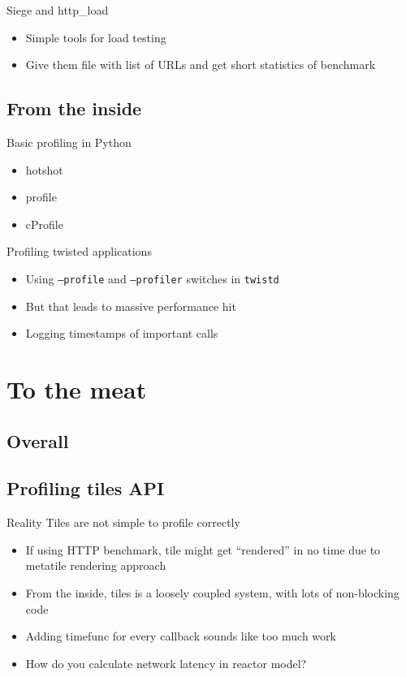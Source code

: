 \documentclass[16pt]{beamer}
\begin{document}
\begin{frame}{Siege and http\_load}
  \begin{itemize}
  \item Simple tools for load testing
  \item Give them file with list of URLs and get short statistics of benchmark
  \end{itemize}
\end{frame}

\subsection{From the inside}

\begin{frame}{Basic profiling in Python}
  \begin{itemize}
  \item hotshot
  \item profile
  \item cProfile
  \end{itemize}
\end{frame}

\begin{frame}{Profiling twisted applications}
  \begin{itemize}
  \item Using \texttt{--profile} and \texttt{--profiler}
    switches in \texttt{twistd}
  \item But that leads to massive performance hit
  \item Logging timestamps of important calls
  \end{itemize}
\end{frame}

\section{To the meat}

\subsection{Overall}

\subsection{Profiling tiles API}

\begin{frame}{Reality}
  Tiles are not simple to profile correctly
  \begin{itemize}
  \item If using HTTP benchmark, tile might get ``rendered'' in no time due to metatile rendering approach
  \item From the inside, tiles is a loosely coupled system, with lots of non-blocking code
  \item Adding timefunc for every callback sounds like too much work
  \item How do you calculate network latency in reactor model?
  \end{itemize}
\end{frame}
\end{document}
